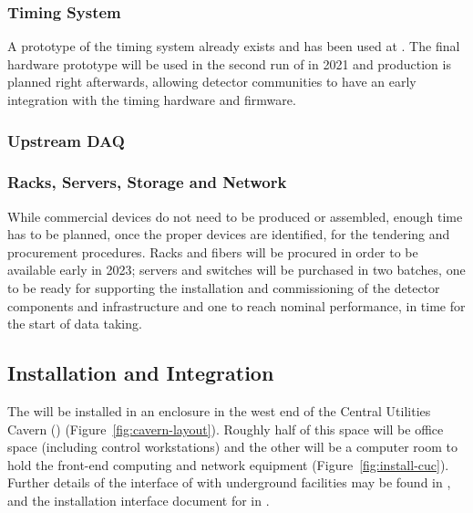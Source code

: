 \subsubsection{Timing System}
A prototype of the timing system already exists and has been used at . The final hardware prototype will be used in the second run of  in 2021 and production is planned right afterwards, allowing detector communities to have an early integration with the timing hardware and firmware.

\subsubsection{Upstream DAQ}


\subsubsection{Racks, Servers, Storage and Network}
While commercial devices do not need to be produced or assembled, enough time has to be planned, once the proper devices are identified, for the tendering and procurement procedures. Racks and fibers will be procured in order to be available early in 2023; servers and switches will be purchased in two batches, one to be ready for supporting the installation and commissioning of the detector components and  infrastructure and one to reach nominal performance, in time for the start of data taking.

\subsection{Installation and Integration}


The  will be installed in an enclosure in the west end of the Central
Utilities Cavern () (Figure~\ref{fig:cavern-layout}).  Roughly
half of this space will be office space (including control
workstations) and the other will be a computer room to hold the 
front-end computing and network equipment (Figure~\ref{fig:install-cuc}). Further details of the interface of  with underground facilities
may be found in , and the installation interface document for  in .

